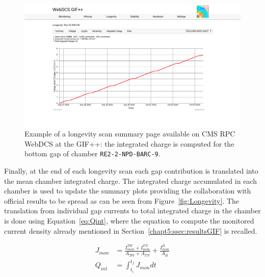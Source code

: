 	\begin{figure}[H]
        \centering
		\includegraphics[width = \linewidth]{fig/chapt5/Longevity-scan-Qint-vs-Time.png}
		\caption{\label{fig:DQM-Longevity-Qint} Example of a longevity scan summary page available on CMS RPC WebDCS at the GIF++: the integrated charge is computed for the bottom gap of chamber \texttt{RE2-2-NPD-BARC-9}.}
	\end{figure}
	
	Finally, at the end of each longevity scan each gap contribution is translated into the mean chamber integrated charge. The integrated charge accumulated in each chamber is used to update the summary plots providing the collaboration with official results to be spread as can be seen from Figure~\ref{fig:Longevity}. The translation from individual gap currents to total integrated charge in the chamber is done using Equation~\ref{eq:Qint}, where the equation to compute the monitored current density already mentioned in Section~\ref{chapt5:ssec:resultsGIF} is recalled.
	
	\begin{equation}
	\label{eq:Qint}
		\begin{aligned}
	J_{mon} &= \frac{I_{mon}^{TW}+I_{mon}^{TN}}{A_{TW}+A_{TN}} + \frac{I_{mon}^B}{A_B}\\
	Q_{int} &= \int_{t_i}^{t_f} J_{mon}dt
		\end{aligned}
	\end{equation}
	
